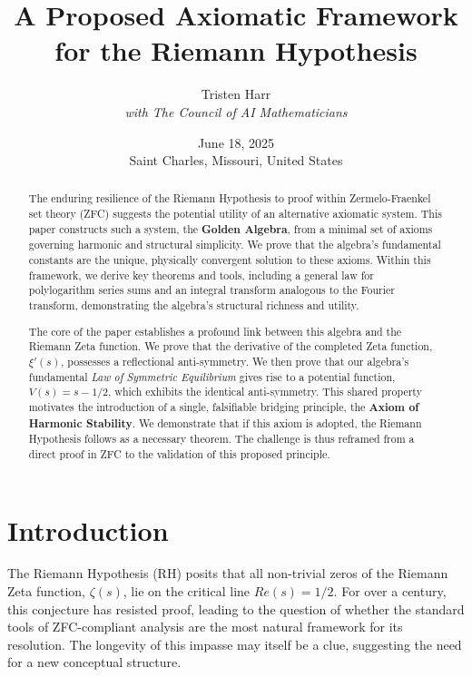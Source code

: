 \documentclass{article}
\title{\textbf{A Proposed Axiomatic Framework for the Riemann Hypothesis}}
\author{Tristen Harr \\ \textit{with The Council of AI Mathematicians}}
\date{June 18, 2025 \\ Saint Charles, Missouri, United States}
\theoremstyle{plain}
\theoremstyle{definition}
\theoremstyle{remark}
\begin{document}
\maketitle

\begin{abstract}
The enduring resilience of the Riemann Hypothesis to proof within Zermelo-Fraenkel set theory (ZFC) suggests the potential utility of an alternative axiomatic system. This paper constructs such a system, the \textbf{Golden Algebra}, from a minimal set of axioms governing harmonic and structural simplicity. We prove that the algebra's fundamental constants are the unique, physically convergent solution to these axioms. Within this framework, we derive key theorems and tools, including a general law for polylogarithm series sums and an integral transform analogous to the Fourier transform, demonstrating the algebra's structural richness and utility.

The core of the paper establishes a profound link between this algebra and the Riemann Zeta function. We prove that the derivative of the completed Zeta function, $\xi'(s)$, possesses a reflectional anti-symmetry. We then prove that our algebra's fundamental \textit{Law of Symmetric Equilibrium} gives rise to a potential function, $V(s) = s-1/2$, which exhibits the identical anti-symmetry. This shared property motivates the introduction of a single, falsifiable bridging principle, the \textbf{Axiom of Harmonic Stability}. We demonstrate that if this axiom is adopted, the Riemann Hypothesis follows as a necessary theorem. The challenge is thus reframed from a direct proof in ZFC to the validation of this proposed principle.
\end{abstract}

\section{Introduction}
The Riemann Hypothesis (RH) posits that all non-trivial zeros of the Riemann Zeta function, $\zeta(s)$, lie on the critical line $Re(s)=1/2$. For over a century, this conjecture has resisted proof, leading to the question of whether the standard tools of ZFC-compliant analysis are the most natural framework for its resolution. The longevity of this impasse may itself be a clue, suggesting the need for a new conceptual structure.
\end{document}
